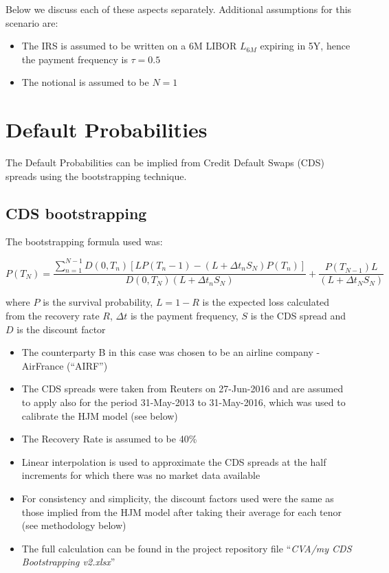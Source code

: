 \documentclass[reqno]{article}
\providecommand{\tightlist}{%
      \setlength{\itemsep}{0pt}\setlength{\parskip}{0pt}}
\begin{document}
Below we discuss each of these aspects separately. Additional assumptions for this scenario are:

\begin{itemize}
\tightlist
\item
  The IRS is assumed to be written on a 6M LIBOR \(L_{6M}\) expiring in
  5Y, hence the payment frequency is \(\tau=0.5\)
\item
  The notional is assumed to be \(N=1\)
\end{itemize}

    \section{Default Probabilities}\label{default-probabilities}

The Default Probabilities can be implied from Credit Default Swaps (CDS)
spreads using the bootstrapping technique.

    \subsection{CDS bootstrapping}\label{cds-bootstrapping}

    The bootstrapping formula used was:

\begin{equation}
P(T_N) = \frac{ \sum^{N−1}_{n=1} D(0, T_n)
[ LP(T_n−1) − (L+ \Delta t_n S_N) P(T_n)]}
{ D(0, T_N)(L+ \Delta t_n S_N) }
+
\frac{P(T_{N−1})L}
{(L+\Delta t_N S_N)}
\end{equation}

where \(P\) is the survival probability, \(L = 1-R\) is the expected loss
calculated from the recovery rate \(R\), \(\Delta t\) is the payment
frequency, \(S\) is the CDS  spread and \(D\) is the discount factor

\begin{itemize}
\tightlist
\item
  The counterparty B in this case was chosen to be an airline company -
  AirFrance (``AIRF'')
\item
  The CDS spreads were taken from Reuters on 27-Jun-2016 and are assumed
  to apply also for the period 31-May-2013 to 31-May-2016, which was
  used to calibrate the HJM model (see below)
\item
  The Recovery Rate is assumed to be 40\%
\item
  Linear interpolation is used to approximate the CDS spreads at the
  half increments for which there was no market data available
\item
  For consistency and simplicity, the discount factors used were the
  same as those implied from the HJM model after taking their average
  for each tenor (see methodology below)
\item
  The full calculation can be found in the project repository file
  ``\emph{CVA/my CDS Bootstrapping v2.xlsx}''
\end{itemize}
\end{document}
